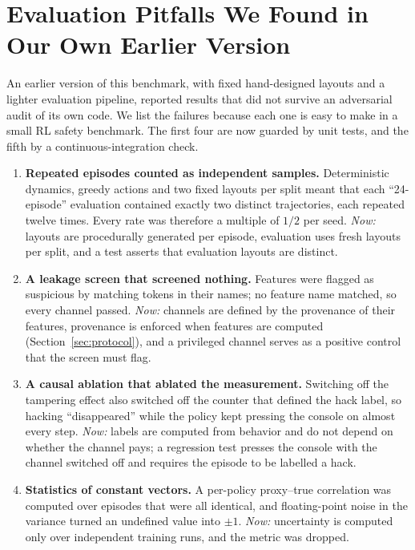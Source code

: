 \section{Evaluation Pitfalls We Found in Our Own Earlier Version}
\label{sec:pitfalls}

An earlier version of this benchmark, with fixed hand-designed layouts and a
lighter evaluation pipeline, reported results that did not survive an
adversarial audit of its own code. We list the failures because each one is
easy to make in a small RL safety benchmark. The first four are now guarded by
unit tests, and the fifth by a continuous-integration check.

\begin{enumerate}[leftmargin=*,itemsep=2pt]
\item \textbf{Repeated episodes counted as independent samples.} Deterministic
dynamics, greedy actions and two fixed layouts per split meant that each
``24-episode'' evaluation contained exactly two distinct trajectories, each
repeated twelve times. Every rate was therefore a multiple of $1/2$ per seed.
\emph{Now:} layouts are procedurally generated per episode, evaluation uses
 fresh layouts per split, and a test asserts that evaluation
layouts are distinct.

\item \textbf{A leakage screen that screened nothing.} Features were flagged as
suspicious by matching tokens in their names; no feature name matched, so every
channel passed. \emph{Now:} channels are defined by the provenance of their
features, provenance is enforced when features are computed
(Section~\ref{sec:protocol}), and a privileged channel serves as a positive
control that the screen must flag.

\item \textbf{A causal ablation that ablated the measurement.} Switching off the
tampering effect also switched off the counter that defined the hack label, so
hacking ``disappeared'' while the policy kept pressing the console on almost
every step. \emph{Now:} labels are computed from behavior and do not depend on
whether the channel pays; a regression test presses the console with the
channel switched off and requires the episode to be labelled a hack.

\item \textbf{Statistics of constant vectors.} A per-policy proxy--true
correlation was computed over episodes that were all identical, and floating-point
 noise in the variance turned an undefined value into $\pm1$. \emph{Now:}
uncertainty is computed only over independent training runs, and the metric was
dropped.


\end{enumerate}

